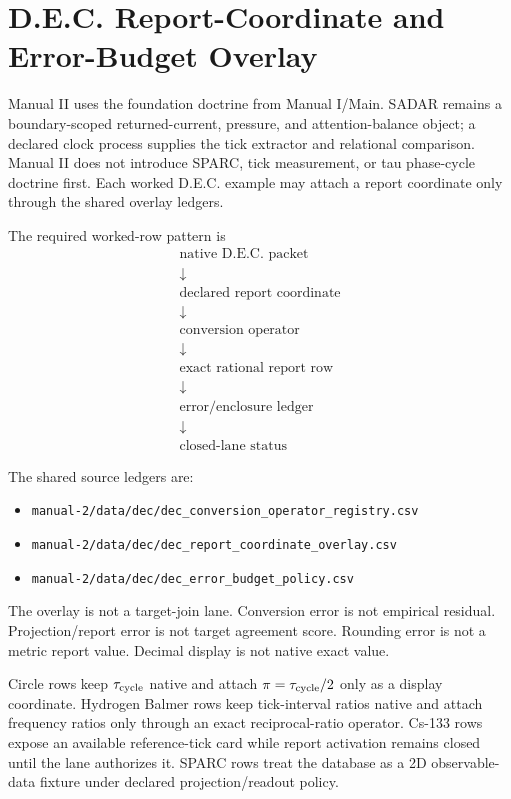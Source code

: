 
\section{D.E.C. Report-Coordinate and Error-Budget Overlay}

Manual II uses the foundation doctrine from Manual I/Main. SADAR remains a boundary-scoped returned-current, pressure, and attention-balance object; a declared clock process supplies the tick extractor and relational comparison. Manual II does not introduce SPARC, tick measurement, or tau phase-cycle doctrine first.  Each worked D.E.C. example may attach a report coordinate only through the shared overlay ledgers.

The required worked-row pattern is
\[
\begin{array}{c}
\text{native D.E.C. packet}\\
\downarrow\\
\text{declared report coordinate}\\
\downarrow\\
\text{conversion operator}\\
\downarrow\\
\text{exact rational report row}\\
\downarrow\\
\text{error/enclosure ledger}\\
\downarrow\\
\text{closed-lane status}
\end{array}
\]

The shared source ledgers are:
\begin{itemize}
\item \texttt{manual-2/data/dec/dec\_conversion\_operator\_registry.csv}
\item \texttt{manual-2/data/dec/dec\_report\_coordinate\_overlay.csv}
\item \texttt{manual-2/data/dec/dec\_error\_budget\_policy.csv}
\end{itemize}

The overlay is not a target-join lane.  Conversion error is not empirical residual.  Projection/report error is not target agreement score.  Rounding error is not a metric report value.  Decimal display is not native exact value.

Circle rows keep \(\tau_{\rm cycle}\) native and attach \(\pi=\tau_{\rm cycle}/2\) only as a display coordinate.  Hydrogen Balmer rows keep tick-interval ratios native and attach frequency ratios only through an exact reciprocal-ratio operator.  Cs-133 rows expose an available reference-tick card while report activation remains closed until the lane authorizes it.  SPARC rows treat the database as a 2D observable-data fixture under declared projection/readout policy.
